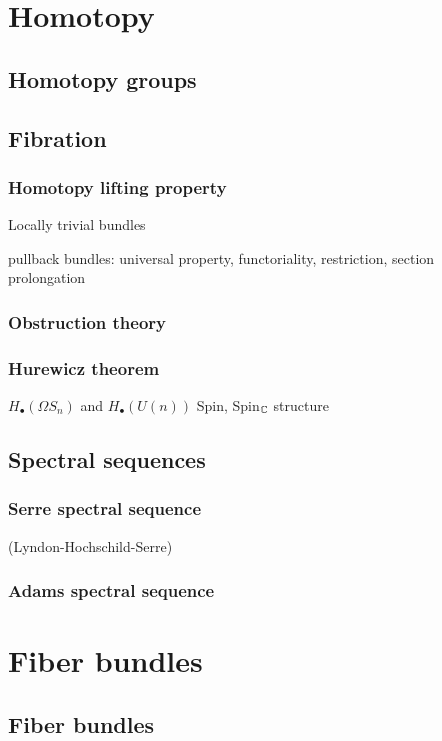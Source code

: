 \documentclass{../../large}
\begin{document}
\part{Homotopy}

\chapter{Homotopy groups}




\chapter{Fibration}
\section{Homotopy lifting property}


Locally trivial bundles

pullback bundles: universal property, functoriality, restriction,
section prolongation

\section{Obstruction theory}
\section{Hurewicz theorem}
$H_\bullet(\Omega S_n)$ and $H_\bullet(U(n))$
Spin, Spin$_{\mathbb{C}}$ structure



\chapter{Spectral sequences}
\section{Serre spectral sequence}
	(Lyndon-Hochschild-Serre)
\section{Adams spectral sequence}






\part{Fiber bundles}

\chapter{Fiber bundles}
\end{document}
